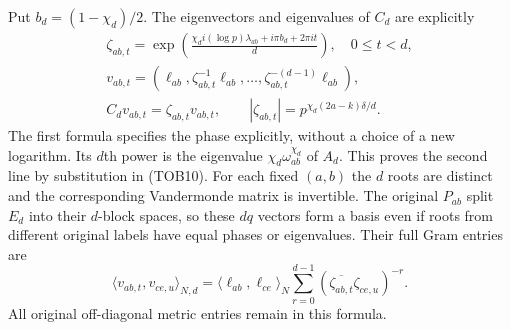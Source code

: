 Put $b_d=(1-\chi_d)/2$. The eigenvectors and eigenvalues of $C_d$
are explicitly
\begin{equation}\tag{TOB16}
\begin{gathered}
 \zeta_{ab,t}=
 \exp\!\left(\frac{\chi_di(\log p)\lambda_{ab}
                              +i\pi b_d+2\pi it}{d}\right),
 \quad 0\le t<d,\\
 v_{ab,t}=(\ell_{ab},\zeta_{ab,t}^{-1}\ell_{ab},\ldots,
                   \zeta_{ab,t}^{-(d-1)}\ell_{ab}),\\
 C_dv_{ab,t}=\zeta_{ab,t}v_{ab,t},\qquad
 |\zeta_{ab,t}|=p^{\chi_d(2a-k)\delta/d}.
\end{gathered}
\end{equation}
The first formula specifies the phase explicitly, without a choice
of a new logarithm. Its $d$th power is the eigenvalue
$\chi_d\omega_{ab}^{\chi_d}$ of $A_d$. This proves the second
line by substitution in (TOB10). For each fixed $(a,b)$ the $d$
roots are distinct and the corresponding Vandermonde matrix is
invertible. The original $P_{ab}$ split $E_d$ into their $d$-block
spaces, so these $dq$ vectors form a basis even if roots from
different original labels have equal phases or eigenvalues.
Their full Gram entries are
\begin{equation}\tag{TOB17}
 \langle v_{ab,t},v_{ce,u}\rangle_{N,d}
 =\langle\ell_{ab},\ell_{ce}\rangle_N
   \sum_{r=0}^{d-1}
        (\overline{\zeta_{ab,t}}\zeta_{ce,u})^{-r}.
\end{equation}
All original off-diagonal metric entries remain in this formula.

